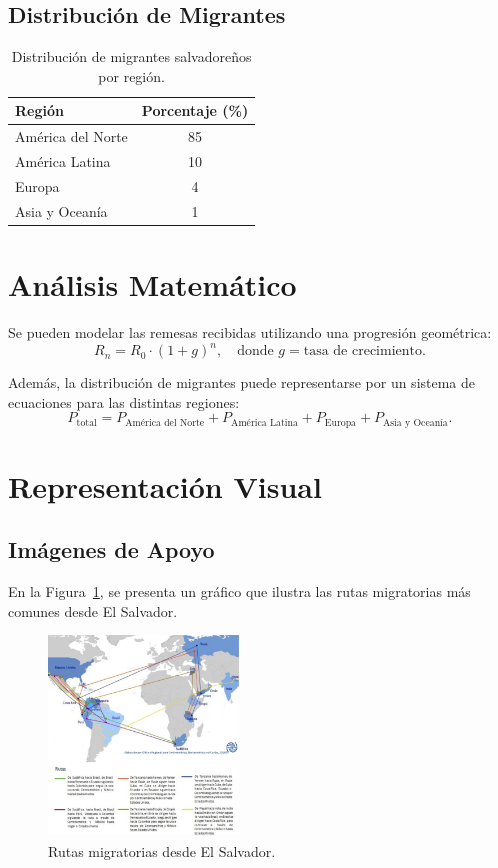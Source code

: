 \documentclass[conference]{IEEEtran}
\begin{document}
\subsection{Distribución de Migrantes}
\begin{table}[H]
\caption{Distribución de migrantes salvadoreños por región.}
\label{table_migrantes}
\centering
\begin{tabular}{|l|c|}
\hline
Región & Porcentaje (\%) \\ \hline
América del Norte & 85 \\ \hline
América Latina & 10 \\ \hline
Europa & 4 \\ \hline
Asia y Oceanía & 1 \\ \hline
\end{tabular}
\end{table}

\section{Análisis Matemático}
Se pueden modelar las remesas recibidas utilizando una progresión geométrica:
\begin{equation}
R_n = R_0 \cdot (1 + g)^n, \quad \text{donde } g = \text{tasa de crecimiento}.
\label{eq:remesas}
\end{equation}

Además, la distribución de migrantes puede representarse por un sistema de ecuaciones para las distintas regiones:
\begin{equation}
P_{\text{total}} = P_{\text{América del Norte}} + P_{\text{América Latina}} + P_{\text{Europa}} + P_{\text{Asia y Oceanía}}.
\label{eq:distribucion}
\end{equation}

\section{Representación Visual}
\subsection{Imágenes de Apoyo}
En la Figura~\ref{fig:migrantes}, se presenta un gráfico que ilustra las rutas migratorias más comunes desde El Salvador.

\begin{figure}[H]
\centering
\includegraphics[width=0.45\textwidth]{imagenes/rutas_migratorias.png}
\caption{Rutas migratorias desde El Salvador.}
\label{fig:migrantes}
\end{figure}
\end{document}

